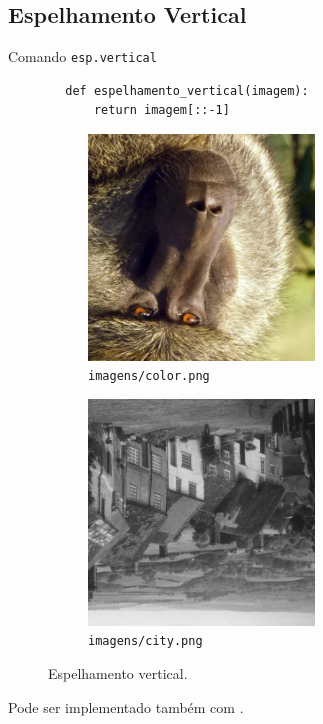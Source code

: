 \subsection{Espelhamento Vertical}

\begin{listing}[h]
    \caption{Comando \texttt{esp.vertical}}

    \begin{verbatim}
        def espelhamento_vertical(imagem):
            return imagem[::-1]
    \end{verbatim}
\end{listing}

\begin{figure}[h]
    \centering
    \begin{subfigure}{0.45\textwidth}
        \centering
        \includegraphics[width=6cm]{resultados/colorflip.png}
        \caption{\texttt{imagens/color.png}}
    \end{subfigure}%
    \begin{subfigure}{0.45\textwidth}
        \centering
        \includegraphics[width=6cm]{resultados/cityflip.png}
        \caption{\texttt{imagens/city.png}}
    \end{subfigure}

    \caption{Espelhamento vertical.}
\end{figure}

Pode ser implementado também com  \autocite{ref:flip}.
